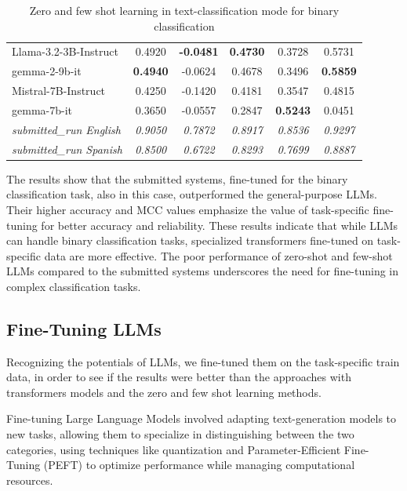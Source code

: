 \documentclass{Configuration_Files/PoliMi3i_thesis}
\begin{document}
\begin{table}[h]
\begin{tabular}{lccccc}
        \hline
        Llama-3.2-3B-Instruct & 0.4920 & \textbf{-0.0481} & \textbf{0.4730} & 0.3728  & 0.5731  \\   
        gemma-2-9b-it         & \textbf{0.4940} & -0.0624 & 0.4678 & 0.3496 & \textbf{0.5859}   \\       
        Mistral-7B-Instruct   & 0.4250 & -0.1420 & 0.4181 & 0.3547 & 0.4815   \\  
        gemma-7b-it           & 0.3650 & -0.0557 & 0.2847 & \textbf{0.5243} & 0.0451   \\
        \hline
        \hline
        \textit{submitted\_run English} & \textit{0.9050} & \textit{0.7872} & \textit{0.8917} & \textit{0.8536} & \textit{0.9297}   \\
        \textit{submitted\_run Spanish} & \textit{0.8500} & \textit{0.6722}  & \textit{0.8293} & \textit{0.7699} & \textit{0.8887}   \\
        \hline
    \end{tabular}
    \caption{\small Zero and few shot learning in text-classification mode for binary classification}
    \label{tab:performance_llms_T1_few_shots_text_classification}
\end{table}
\FloatBarrier

The results show that the submitted systems, fine-tuned for the binary classification task, also in this case, outperformed the general-purpose LLMs. Their higher accuracy and MCC values emphasize the value of task-specific fine-tuning for better accuracy and reliability. These results indicate that while LLMs can handle binary classification tasks, specialized transformers fine-tuned on task-specific data are more effective. The poor performance of zero-shot and few-shot LLMs compared to the submitted systems underscores the need for fine-tuning in complex classification tasks.

\subsection{Fine-Tuning LLMs}
Recognizing the potentials of LLMs, we fine-tuned them on the task-specific train data, in order to see if the results were better than the approaches with transformers models and the zero and few shot learning methods. 

Fine-tuning Large Language Models involved adapting text-generation models to new tasks, allowing them to specialize in distinguishing between the two categories, using techniques like quantization and Parameter-Efficient Fine-Tuning (PEFT) to optimize performance while managing computational resources.
\end{document}
